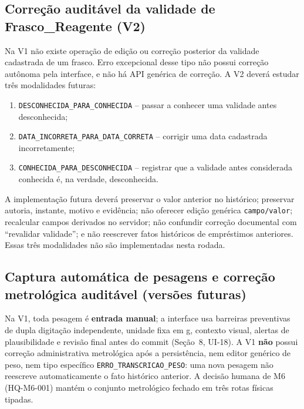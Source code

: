 \subsection{Correção auditável da validade de Frasco\_Reagente (V2)}
Na V1 não existe operação de edição ou correção posterior da validade cadastrada de um frasco. Erro excepcional desse tipo não possui correção autônoma pela interface, e não há API genérica de correção. A V2 deverá estudar três modalidades futuras:

\begin{enumerate}
    \item \texttt{DESCONHECIDA\_PARA\_CONHECIDA} -- passar a conhecer uma validade antes desconhecida;
    \item \texttt{DATA\_INCORRETA\_PARA\_DATA\_CORRETA} -- corrigir uma data cadastrada incorretamente;
    \item \texttt{CONHECIDA\_PARA\_DESCONHECIDA} -- registrar que a validade antes considerada conhecida é, na verdade, desconhecida.
\end{enumerate}

A implementação futura deverá preservar o valor anterior no histórico; preservar autoria, instante, motivo e evidência; não oferecer edição genérica \texttt{campo/valor}; recalcular campos derivados no servidor; não confundir correção documental com ``revalidar validade''; e não reescrever fatos históricos de empréstimos anteriores. Essas três modalidades não são implementadas nesta rodada.

\subsection{Captura automática de pesagens e correção metrológica auditável (versões futuras)}
Na V1, toda pesagem é \textbf{entrada manual}; a interface usa barreiras preventivas de dupla digitação independente, unidade fixa em g, contexto visual, alertas de plausibilidade e revisão final antes do commit (Seção~8, UI-18). A V1 \textbf{não} possui correção administrativa metrológica após a persistência, nem editor genérico de peso, nem tipo específico \texttt{ERRO\_TRANSCRICAO\_PESO}: uma nova pesagem não reescreve automaticamente o fato histórico anterior. A decisão humana de M6 (HQ-M6-001) mantém o conjunto metrológico fechado em três rotas físicas tipadas.

